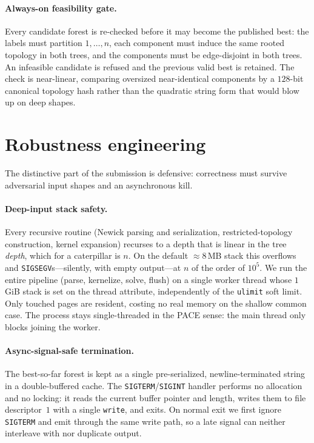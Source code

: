 \documentclass[a4paper,UStitle,numberwithinsect=false,autoref]{lipics-v2021}
\begin{document}
\paragraph{Always-on feasibility gate.} Every candidate forest is re-checked before
it may become the published best: the labels must partition $1,\dots,n$, each
component must induce the same rooted topology in both trees, and the components must
be edge-disjoint in both trees. An infeasible candidate is refused and the previous
valid best is retained. The check is near-linear, comparing oversized near-identical
components by a $128$-bit canonical topology hash rather than the quadratic string form
that would blow up on deep shapes.

\section{Robustness engineering}

The distinctive part of the submission is defensive: correctness must survive
adversarial input shapes and an asynchronous kill.

\paragraph{Deep-input stack safety.} Every recursive routine (Newick parsing and
serialization, restricted-topology construction, kernel expansion) recurses to a
depth that is linear in the tree \emph{depth}, which for a caterpillar is $n$. On the
default $\approx 8$\,MB stack this overflows and \texttt{SIGSEGV}s---silently, with
empty output---at $n$ of the order of $10^5$. We run the entire pipeline (parse,
kernelize, solve, flush) on a single worker thread whose $1$\,GiB stack is set on the
thread attribute, independently of the \texttt{ulimit} soft limit. Only touched pages
are resident, costing no real memory on the shallow common case. The process stays
single-threaded in the PACE sense: the main thread only blocks joining the worker.

\paragraph{Async-signal-safe termination.} The best-so-far forest is kept as a single
pre-serialized, newline-terminated string in a double-buffered cache. The
\texttt{SIGTERM}/\texttt{SIGINT} handler performs no allocation and no locking: it
reads the current buffer pointer and length, writes them to file descriptor~$1$ with
a single \texttt{write}, and exits. On normal exit we first ignore \texttt{SIGTERM} and
emit through the same write path, so a late signal can neither interleave with nor
duplicate output.
\end{document}
